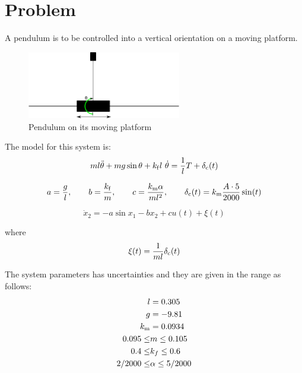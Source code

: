 \chapter{Problem}
A pendulum is to be controlled into a vertical orientation on a moving platform.
\begin{figure}[htbp]
        \centering
        \includegraphics[width=0.6\textwidth,trim=3cm 0cm 3cm 0cm, clip]{pendul.png}
        \caption{Pendulum on its moving platform}
        \label{fig:problem}
\end{figure}
The model for this system is:
\begin{equation}
        m l \Ddot{\theta} + m g \sin\theta + k_{\mathrm{f}}  l \ \dot{\theta} = \frac{1}{l}T + \delta_{\mathrm{c}}(t)
\end{equation}

\begin{equation}
        a=\frac{g}{l}, \qquad b=\frac{k_{\mathrm{f}}}{m}, \qquad c= \frac{k_{\mathrm{m}}\alpha}{m l^2}, \qquad \delta_{\mathrm{c}}(t) = k_{\mathrm{m}} \frac{A\cdot5}{2000}\sin(t)
\end{equation}

\begin{equation}
        \dot{x}_2 = - a \sin x_1 - b x_2 + c u(t) + \xi(t)
\end{equation}

where
\begin{equation}
        \xi(t) = \frac{1}{m l} \delta_{\mathrm{c}}(t)
\end{equation}

The system parameters has uncertainties and they are given in the range as follows:
\begin{equation}
        \begin{split}
                l &= 0.305 \\
                g &= -9.81 \\
                k_{\mathrm{m}} &= 0.0934 \\
                0.095 \leq & m \leq 0.105 \\
                0.4 \leq & k_f \leq 0.6 \\
                2/2000 \leq & \alpha \leq 5/2000 \\
                \nonumber
        \end{split}
\end{equation}

